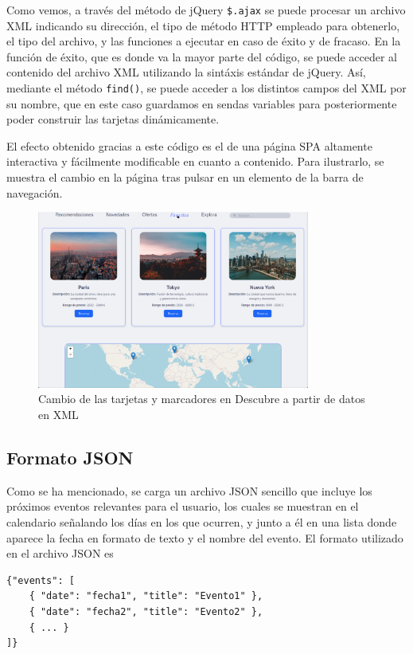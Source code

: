 \documentclass[11pt, a4paper]{book}
\begin{document}
    Como vemos, a través del método de jQuery \texttt{\$.ajax} se puede procesar un archivo XML indicando su dirección, el tipo de método HTTP empleado para obtenerlo, el tipo del archivo, y las funciones a ejecutar en caso de éxito y de fracaso. En la función de éxito, que es donde va la mayor parte del código, se puede acceder al contenido del archivo XML utilizando la sintáxis estándar de jQuery. Así, mediante el método \texttt{find()}, se puede acceder a los distintos campos del XML por su nombre, que en este caso guardamos en sendas variables para posteriormente poder construir las tarjetas dinámicamente. 

    El efecto obtenido gracias a este código es el de una página SPA altamente interactiva y fácilmente modificable en cuanto a contenido. Para ilustrarlo, se muestra el cambio en la página tras pulsar en un elemento de la barra de navegación.
    
	\begin{figure} [H]
		\centering
        \includegraphics[width=0.8\textwidth]{CSS/4 extra1.png}
		\caption{Cambio de las tarjetas y marcadores en Descubre a partir de datos en XML}
	\end{figure}

	\subsection{Formato JSON}
	Como se ha mencionado, se carga un archivo JSON sencillo que incluye los próximos eventos relevantes para el usuario, los cuales se muestran en el calendario señalando los días en los que ocurren, y junto a él en una lista donde aparece la fecha en formato de texto y el nombre del evento. El formato utilizado en el archivo JSON es
	
	\begin{lstlisting}
{"events": [
	{ "date": "fecha1", "title": "Evento1" },
	{ "date": "fecha2", "title": "Evento2" },
    { ... }
]}
	\end{lstlisting}
\end{document}
